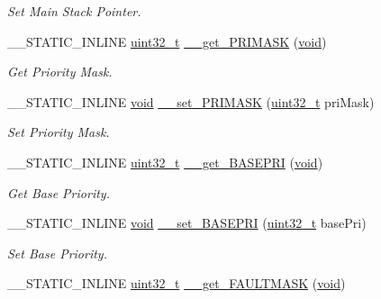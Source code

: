\begin{DoxyCompactItemize}
\begin{DoxyCompactList}\small\item\em Set Main Stack Pointer. \end{DoxyCompactList}\item 
\-\_\-\-\_\-\-S\-T\-A\-T\-I\-C\-\_\-\-I\-N\-L\-I\-N\-E \hyperlink{stdint_8h_a435d1572bf3f880d55459d9805097f62}{uint32\-\_\-t} \hyperlink{group___c_m_s_i_s___core___reg_acc_functions_ga799b5d9a2ae75e459264c8512c7c0e02}{\-\_\-\-\_\-get\-\_\-\-P\-R\-I\-M\-A\-S\-K} (\hyperlink{group___n_a_m_e_ga18028b8badbf1ea7e704ccac3c488e82}{void})
\begin{DoxyCompactList}\small\item\em Get Priority Mask. \end{DoxyCompactList}\item 
\-\_\-\-\_\-\-S\-T\-A\-T\-I\-C\-\_\-\-I\-N\-L\-I\-N\-E \hyperlink{group___n_a_m_e_ga18028b8badbf1ea7e704ccac3c488e82}{void} \hyperlink{group___c_m_s_i_s___core___reg_acc_functions_ga70b4e1a6c1c86eb913fb9d6e8400156f}{\-\_\-\-\_\-set\-\_\-\-P\-R\-I\-M\-A\-S\-K} (\hyperlink{stdint_8h_a435d1572bf3f880d55459d9805097f62}{uint32\-\_\-t} pri\-Mask)
\begin{DoxyCompactList}\small\item\em Set Priority Mask. \end{DoxyCompactList}\item 
\-\_\-\-\_\-\-S\-T\-A\-T\-I\-C\-\_\-\-I\-N\-L\-I\-N\-E \hyperlink{stdint_8h_a435d1572bf3f880d55459d9805097f62}{uint32\-\_\-t} \hyperlink{group___c_m_s_i_s___core___reg_acc_functions_ga32da759f46e52c95bcfbde5012260667}{\-\_\-\-\_\-get\-\_\-\-B\-A\-S\-E\-P\-R\-I} (\hyperlink{group___n_a_m_e_ga18028b8badbf1ea7e704ccac3c488e82}{void})
\begin{DoxyCompactList}\small\item\em Get Base Priority. \end{DoxyCompactList}\item 
\-\_\-\-\_\-\-S\-T\-A\-T\-I\-C\-\_\-\-I\-N\-L\-I\-N\-E \hyperlink{group___n_a_m_e_ga18028b8badbf1ea7e704ccac3c488e82}{void} \hyperlink{group___c_m_s_i_s___core___reg_acc_functions_ga360c73eb7ffb16088556f9278953b882}{\-\_\-\-\_\-set\-\_\-\-B\-A\-S\-E\-P\-R\-I} (\hyperlink{stdint_8h_a435d1572bf3f880d55459d9805097f62}{uint32\-\_\-t} base\-Pri)
\begin{DoxyCompactList}\small\item\em Set Base Priority. \end{DoxyCompactList}\item 
\-\_\-\-\_\-\-S\-T\-A\-T\-I\-C\-\_\-\-I\-N\-L\-I\-N\-E \hyperlink{stdint_8h_a435d1572bf3f880d55459d9805097f62}{uint32\-\_\-t} \hyperlink{group___c_m_s_i_s___core___reg_acc_functions_gaa78e4e6bf619a65e9f01b4af13fed3a8}{\-\_\-\-\_\-get\-\_\-\-F\-A\-U\-L\-T\-M\-A\-S\-K} (\hyperlink{group___n_a_m_e_ga18028b8badbf1ea7e704ccac3c488e82}{void})

\end{DoxyCompactItemize}

